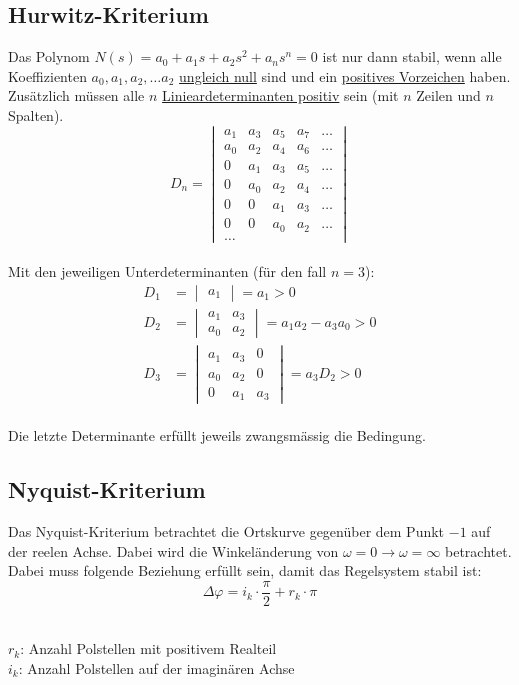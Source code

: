 \subsection{Hurwitz-Kriterium}
Das Polynom $N(s) = a_0 + a_1s + a_2s^2 + a_ns^n = 0$ ist nur dann stabil, 
wenn alle Koeffizienten $a_0, a_1, a_2, \ldots a_2$ \uline{ungleich null} sind und
ein \uline{positives Vorzeichen} haben. Zusätzlich müssen alle $n$ \uline{Linieardeterminanten positiv} sein (mit $n$ Zeilen und $n$ Spalten).  
\[
	D_n = \begin{vmatrix}
	a_1 & a_3 & a_5 & a_7 & \ldots \\ 
	a_0 & a_2 & a_4 & a_6 & \ldots \\ 
	0 & a_1 & a_3 & a_5 & \ldots \\ 
	0 & a_0 & a_2 & a_4 & \ldots \\ 
	0 & 0 & a_1 & a_3 & \ldots \\ 
	0 & 0 & a_0 & a_2 & \ldots \\
	\ldots
	\end{vmatrix} 
\]\\
Mit den jeweiligen Unterdeterminanten (für den fall $n=3$):\\
\[\begin{aligned}
	D_1 &= \begin{vmatrix}
		a_1 
		\end{vmatrix} = a_1 > 0\\
	D_2 &= \begin{vmatrix}
		a_1 & a_3 \\
		a_0 & a_2
	\end{vmatrix} = a_1a_2 - a_3a_0 > 0\\
	D_3 &= \begin{vmatrix}
		a_1 & a_3 & 0\\
		a_0 & a_2 & 0\\
		0	& a_1 & a_3
	\end{vmatrix} = a_3 D_2 > 0
\end{aligned}\]\\
Die letzte Determinante erfüllt jeweils zwangsmässig die Bedingung.

\subsection{Nyquist-Kriterium}
Das Nyquist-Kriterium betrachtet die Ortskurve gegenüber dem Punkt $-1$ auf der reelen Achse. Dabei wird die Winkeländerung von $\omega = 0 \rightarrow \omega = \infty$ betrachtet. Dabei muss folgende Beziehung erfüllt sein, damit das Regelsystem stabil ist:
\[
	\Delta \varphi = i_k \cdot \frac{\pi}{2} + r_k \cdot \pi
\]\\
\begin{footnotesize}
	$r_k$: Anzahl Polstellen mit positivem Realteil\\
	$i_k$: Anzahl Polstellen auf der imaginären Achse
\end{footnotesize}

